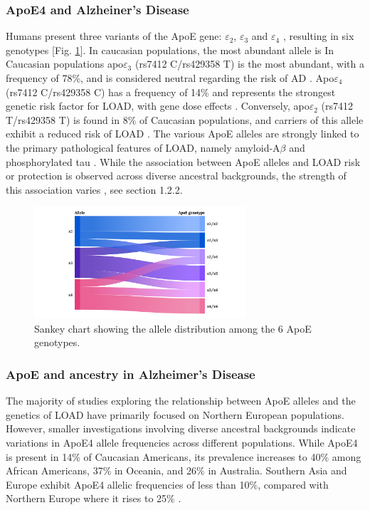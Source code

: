 \documentclass{amsart}
\theoremstyle{plain}
\begin{document}
\subsubsection{ApoE4 and Alzheiner's Disease}
Humans present three variants of the ApoE gene: $\varepsilon_2$, $\varepsilon_3$ and $\varepsilon_4$ \cite{Husain2021APOETherapeutics, Yang2023ApolipoproteinDisease}, resulting in six genotypes [Fig. \ref{fig1}]. In caucasian populations, the most abundant allele is In Caucasian populations apo$\varepsilon_3$ (rs7412 C/rs429358 T) is the most abundant, with a frequency of 78\%, and is considered neutral regarding the risk of AD \cite{Liu2013ApolipoproteinTherapy}. Apo$\varepsilon_4$ (rs7412 C/rs429358 C) has a frequency of 14\% and represents the strongest genetic risk factor for LOAD, with gene dose effects \cite{Strittmatter1993ApolipoproteinDisease}. Conversely, apo$\varepsilon_2$ (rs7412 T/rs429358 T) is found in 8\% of Caucasian populations, and carriers of this allele exhibit a reduced risk of LOAD \cite{Liu2013ApolipoproteinTherapy}. The various ApoE alleles are strongly linked to the primary pathological features of LOAD, namely amyloid-A$\beta$ and phosphorylated tau \cite{Deming2017Genome-wideModifiers}. While the association between ApoE alleles and LOAD risk or protection is observed across diverse ancestral backgrounds, the strength of this association varies \cite{Belloy2019AForward, Farrer1997EffectsMeta-analysis}, see section 1.2.2.

\begin{figure}[]
  \includegraphics[width=0.7\textwidth]{figures/ApoE@2x.png}
    \caption{Sankey chart showing the allele distribution among the 6 ApoE genotypes.}
  \label{fig1}
\end{figure}

\subsubsection{ApoE and ancestry in Alzheimer's Disease}
The majority of studies exploring the relationship between ApoE alleles and the genetics of LOAD have primarily focused on Northern European populations\cite{Yang2023ApolipoproteinDisease}. However, smaller investigations involving diverse ancestral backgrounds indicate variations in ApoE4 allele frequencies across different populations\cite{Yang2023ApolipoproteinDisease}. While ApoE4 is present in 14\% of Caucasian Americans, its prevalence increases to 40\% among African Americans, 37\% in Oceania, and 26\% in Australia. Southern Asia and Europe exhibit ApoE4 allelic frequencies of less than 10\%, compared with Northern Europe where it rises to 25\% \cite{Belloy2019AForward, Egert2012ApoEFactors, Eisenberg2010WorldwideHistory, Logue2011AAmericans}.
\end{document}
